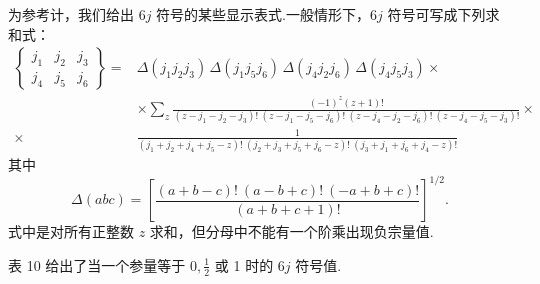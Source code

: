 为参考计，我们给出 $6j$ 符号的某些显示表式.一般情形下，$6j$ 符号可写成下列求和式：
\begin{equation}
\begin{aligned}
  \left\{\begin{array}{ccc}j_1&j_2&j_3\\j_4&j_5&j_6\end{array}\right\}
  ={}&\Delta(j_1j_2j_3)\,\Delta(j_1j_5j_6)\,\Delta(j_4j_2j_6)\,\Delta(j_4j_5j_3)\times\\
  &\times\sum_z\tfrac{(-1)^z(z+1)!}
  {(z-j_1-j_2-j_3)!\ (z-j_1-j_5-j_6)!\ (z-j_4-j_2-j_6)!\ (z-j_4-j_5-j_3)!}\times\\
  \times&\tfrac{1}{(j_1+j_2+j_4+j_5-z)!\ (j_2+j_3+j_5+j_6-z)!\ (j_3+j_1+j_6+j_4-z)!}
\end{aligned}
\end{equation}
其中
\begin{equation*}
  \Delta(abc)=\left[\frac{(a+b-c)!\ (a-b+c)!\ (-a+b+c)!}{(a+b+c+1)!}\right]^{1/2}.
\end{equation*}
式中是对所有正整数 $z$ 求和，但分母中不能有一个阶乘出现负宗量值.

表 10 给出了当一个参量等于 $0,\tfrac12$ 或 1 时的 $6j$ 符号值.


